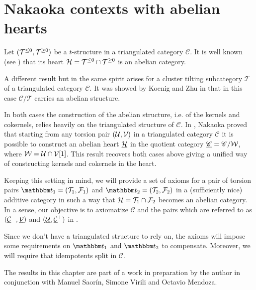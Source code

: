 \chapter{Nakaoka contexts with abelian hearts}\label{ch:nakaoka} %

Let $(\mathcal{T}^{\leq 0},\mathcal{T}^{\geq 0})$ be a $t$-structure in a triangulated category $\mathscr{C}$. It is well known (see \cite{bbd82}) that its heart $\mathcal{H}=\mathcal{T}^{\leq 0}\cap\mathcal{T}^{\geq 0}$ is an abelian category.

A different result but in the same spirit arises for a cluster tilting subcategory $\mathscr{T}$ of a triangulated category $\mathscr{C}$. It was showed by Koenig and Zhu in \cite{Koenig2008} that in this case $\mathscr{C}/\mathscr{T}$ carries an abelian structure.

In both cases the construction of the abelian structure, i.e. of the kernels and cokernels, relies heavily on the triangulated structure of $\mathscr{C}$. In \cite{Nakaokaa}, Nakaoka proved that starting from any torsion pair $(\mathcal{U},\mathcal{V})$ in a triangulated category $\mathscr{C}$ it is possible to construct an abelian heart $\underline{\mathcal{H}}$ in the quotient category $\underline{\mathscr{C}}=\mathscr{C}/\mathcal{W}$, where $\mathcal{W}=\mathcal{U}\cap\mathcal{V}[1]$. 
This result recovers both cases above giving a unified way of constructing kernels and cokernels in the heart.

Keeping this setting in mind, we will provide a set of axioms for a pair of torsion pairs $\t_1=(\T_1,\F_1)$ and $\t_2=(\T_2,\F_2)$ in a (sufficiently nice) 
additive category in such a way that $\mathcal{H} = \mathcal{T}_1\cap\mathcal{F}_2$ becomes an abelian category. In a sense, our objective is to axiomatize $\underline{\mathscr{C}}$ and the pairs which are referred to as $(\underline{\mathcal{C}}^-,\underline{\mathcal{V}})$ and $(\underline{\mathcal{U}},\underline{\mathcal{C}}^+)$ in \cite{Nakaokaa}. 

Since we don't have a triangulated structure to rely on, the axioms will impose some requirements on $\t_1$ and $\t_2$ to compensate. Moreover, we will require that idempotents split in $\mathscr{C}$.

The results in this chapter are part of a work in preparation by the author in conjunction with Manuel Saor\'in, Simone Virili and Octavio Mendoza.

